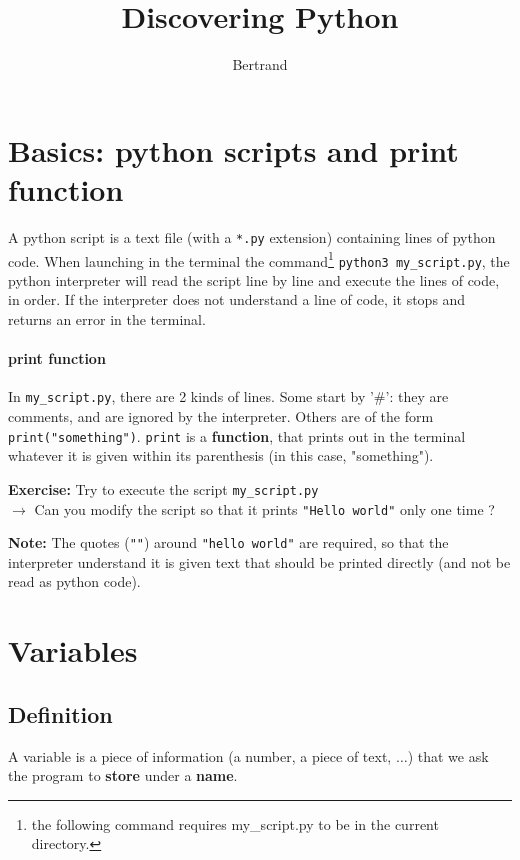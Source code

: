 \documentclass{article}
\title{Discovering Python}
\author{Bertrand}
\newcommand{\note}[1]{
\begin{mdframed}[backgroundcolor=green!30!white]
\textbf{Note:} #1
\end{mdframed}
}
\newcommand{\exercise}[1]{
\begin{mdframed}[backgroundcolor=black!20!white]
\textbf{Exercise:} #1
\end{mdframed}
}
\begin{document}
\maketitle

\tableofcontents

\section{Basics: python scripts and print function}


A python script is a text file (with a \texttt{*.py} extension) containing lines of python code.
When launching in the terminal the command\footnote{the following command requires my\_script.py to be in the current directory.} \texttt{python3 my\_script.py}, the python interpreter
will read the script line by line and execute the lines of code, in order.
If the interpreter does not understand a line of code, it stops and returns an error in the terminal.

\paragraph{print function} In \texttt{my\_script.py}, there are 2 kinds of
lines. Some start by '\#': they are comments, and are ignored by the interpreter.
Others are of the form \texttt{print("something")}. \texttt{print} is a \textbf{function}, that prints out in the terminal whatever it is given within its
parenthesis (in this case, "something").  

\exercise{
Try to execute the script \texttt{my\_script.py}\\
$\rightarrow$ Can you modify the script so that it prints \texttt{"Hello world"}
only one time ?
}

\note{
The quotes (\texttt{""}) around \texttt{"hello world"}
are required, so that the interpreter understand it is given text that should
be printed directly (and not be read as python code).
}

\section{Variables}

\subsection{Definition}

A variable is a piece of information (a number, a piece of text, $\dots$) that
we ask the program to \textbf{store} under a \textbf{name}.
\end{document}
